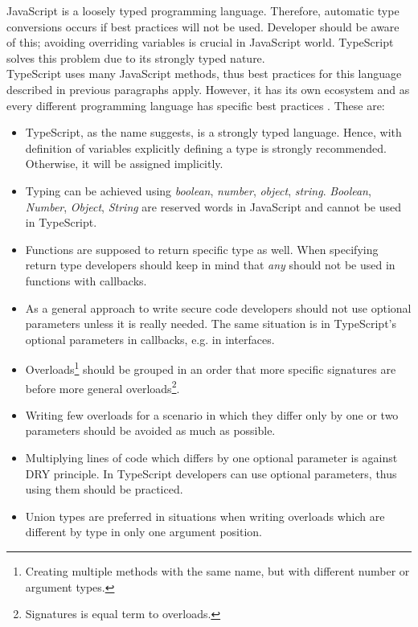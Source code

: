 \documentclass{article} %
\begin{document}
JavaScript is a loosely typed programming language. Therefore, automatic type conversions occurs if best practices will not be used. Developer should be aware of this; avoiding overriding variables is crucial in JavaScript world. TypeScript solves this problem due to its strongly typed nature.\\
\newline
TypeScript uses many JavaScript methods, thus best practices for this language described in previous paragraphs apply. However, it has its own ecosystem and as every different programming language has specific best practices \cite{bib:ts_best_practices}. These are:
\begin{itemize}
    \item TypeScript, as the name suggests, is a strongly typed language. Hence, with definition of variables explicitly defining a type is strongly recommended. Otherwise, it will be assigned implicitly.
    \item Typing can be achieved using \textit{boolean}, \textit{number}, \textit{object}, \textit{string}. \textit{Boolean}, \textit{Number}, \textit{Object}, \textit{String} are reserved words in JavaScript and cannot be used in TypeScript.
    \item Functions are supposed to return specific type as well. When specifying return type developers should keep in mind that \textit{any} should not be used in functions with callbacks.
    \item As a general approach to write secure code developers should not use optional parameters unless it is really needed. The same situation is in TypeScript's optional parameters in callbacks, e.g. in interfaces.
    \item Overloads\footnote{Creating multiple methods with the same name, but with different number or argument types.} should be grouped in an order that more specific signatures are before more general overloads\footnote{Signatures is equal term to overloads.}.
    \item Writing few overloads for a scenario in which they differ only by one or two parameters should be avoided as much as possible.
    \item Multiplying lines of code which differs by one optional parameter is against DRY principle. In TypeScript developers can use optional parameters, thus using them should be practiced.
    \item Union types are preferred in situations when writing overloads which are different by type in only one argument position.
\end{itemize}
\end{document}
